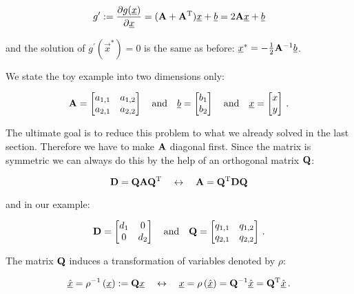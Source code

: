 \documentclass[a4paper,10pt]{article}
\begin{document}
\begin{equation}
 g^\prime := \frac{\partial g(\underline{x})}{\partial \underline{x}}
           = (\mathbf{A}+\mathbf{A}{}^{\textnormal{T}}) \underline{x} + \underline{b} = 2 \mathbf{A} \underline{x} + \underline{b}
\end{equation}

and the solution of $g^\prime(\vec{x}^{*}) = 0$ is the same as before:
$\underline{x}^{*} = -\frac{1}{2}\mathbf{A}{}^{-1} \underline{b}$.

We state the toy example into two dimensions only:

\begin{equation}
 \mathbf{A} =
 \begin{bmatrix}
  a_{1,1} & a_{1,2} \\ a_{2,1} & a_{2,2}
 \end{bmatrix}
 \quad \mathrm{and} \quad
 \underline{b} =
 \begin{bmatrix}
  b_1 \\ b_2
 \end{bmatrix}
 \quad \mathrm{and} \quad
 \underline{x} =
 \begin{bmatrix}
  x \\ y
 \end{bmatrix} \,.
\end{equation}

The ultimate goal is to reduce this problem to what we already solved
in the last section. Therefore we have to make $\mathbf{A}$ diagonal first.
Since the matrix is symmetric we can always do this by the help of an
orthogonal matrix $\mathbf{Q}$:

\begin{equation}
 \mathbf{D} = \mathbf{Q} \mathbf{A} \mathbf{Q}{}^{\textnormal{T}}
 \quad \leftrightarrow \quad
 \mathbf{A} = \mathbf{Q}{}^{\textnormal{T}} \mathbf{D} \mathbf{Q}
\end{equation}

and in our example:

\begin{equation}
 \mathbf{D} =
 \begin{bmatrix}
  d_1 & 0 \\
  0   & d_2
 \end{bmatrix}
 \quad \mathrm{and} \quad
 \mathbf{Q} =
 \begin{bmatrix}
  q_{1,1} & q_{1,2} \\
  q_{2,1} & q_{2,2}
 \end{bmatrix} \,.
\end{equation}

The matrix $\mathbf{Q}$ induces a transformation of variables denoted by $\rho$:

\begin{equation}
 \underline{\hat{x}} = \rho^{-1}\left(\underline{x}\right) := \mathbf{Q} \underline{x}
 \quad \leftrightarrow \quad
 \underline{x} = \rho\left(\underline{\hat{x}}\right) = \mathbf{Q}{}^{-1} \underline{\hat{x}} = \mathbf{Q}{}^{\textnormal{T}} \underline{\hat{x}} \,.
\end{equation}
\end{document}
